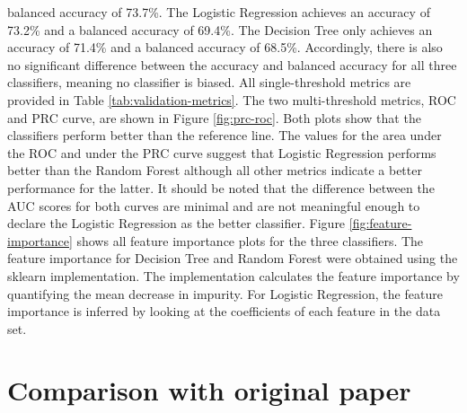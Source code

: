 balanced accuracy of 73.7\%. The Logistic Regression achieves an accuracy of 
73.2\% and a balanced accuracy of 69.4\%. The Decision Tree only achieves an 
accuracy of 71.4\% and a balanced accuracy of 68.5\%. Accordingly, there is 
also no significant difference between the accuracy and balanced accuracy for 
all three classifiers, meaning no classifier is biased.
All single-threshold metrics are provided in Table \ref{tab:validation-metrics}.
The two multi-threshold metrics, ROC and PRC curve, are shown in Figure 
\ref{fig:prc-roc}. Both plots show that the classifiers perform better than the 
reference line. The values for the area under the ROC and under the PRC curve 
suggest that Logistic Regression performs better than the Random Forest 
although all other metrics indicate a better performance for the latter. It 
should be noted that the difference between the AUC scores for both curves are 
minimal and are not meaningful enough to declare the Logistic Regression as the 
better classifier.
Figure \ref{fig:feature-importance} shows all feature importance plots for the 
three classifiers. The feature importance for Decision Tree and Random Forest 
were obtained using the sklearn implementation. The implementation calculates 
the 
feature importance by quantifying the mean decrease in impurity.\cite{RN178}
For Logistic Regression, the feature importance is inferred by looking at the 
coefficients of each feature in the data set.
\section{Comparison with original paper}
